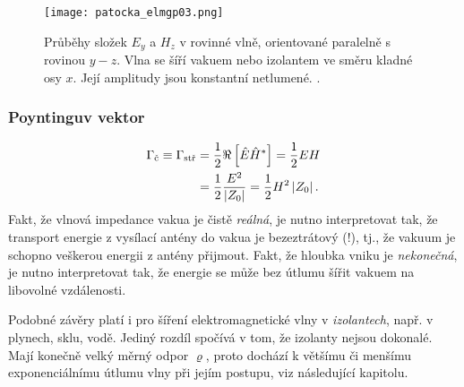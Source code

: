         \begin{figure}[ht!]
          \centering
          \texttt{[image: patocka\_elmgp03.png]}
          \caption{Průběhy složek \(E_y\) a \(H_z\) v rovinné vlně, orientované paralelně s rovinou 
                   \(y-z\). Vlna se šíří vakuem nebo izolantem ve směru kladné osy \(x\). Její 
                   amplitudy jsou konstantní netlumené. \cite[s.~77]{Patocka4}.}
          \label{ES:fig_elmgp03}
        \end{figure}
        
      \subsubsection{Poyntinguv vektor}
        \begin{align}\label{ES:eq_elmagp41}
          \Gamma_\text{č} \equiv \Gamma_\text{stř}
            &= \frac{1}{2}\Re\left[\hat{E}\hat{H}^*\right]      
             = \frac{1}{2}EH                                            \nonumber\\
            &= \frac{1}{2}\frac{E^2}{\left\lvert Z_0\right\rvert}
            = \frac{1}{2}H^2\left\lvert Z_0\right\rvert.
        \end{align}
        Fakt, že vlnová impedance vakua je čistě \emph{reálná}, je nutno interpretovat tak, že   
        transport energie z vysílací antény do vakua je bezeztrátový (!), tj., že vakuum je schopno 
        veškerou energii z antény přijmout. Fakt, že hloubka vniku je \emph{nekonečná}, je nutno 
        interpretovat tak, že energie se může bez útlumu šířit vakuem na libovolné vzdálenosti.

        Podobné závěry platí i pro šíření elektromagnetické vlny v \emph{izolantech}, např. v 
        plynech, sklu, vodě. Jediný rozdíl spočívá v tom, že izolanty nejsou dokonalé. Mají konečně 
        velký měrný odpor \(\varrho\), proto dochází k většímu či menšímu exponenciálnímu útlumu 
        vlny při jejím postupu, viz následující kapitolu.

